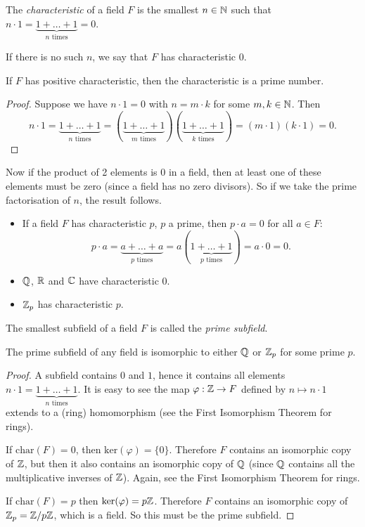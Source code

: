 \begin{definition}
	The \emph{characteristic} of a field $F$ is the  smallest $n \in \mathbb{N}$ such that $n \cdot 1 = \underbrace{1 + \ldots + 1}_{n \text{ times}} = 0$.
	
	If there is no such $n$, we say that $F$ has characteristic $0$.
\end{definition}

\begin{proposition}
	If $F$ has positive characteristic, then the characteristic is a prime number.
	\begin{proof}
		Suppose we have $n \cdot 1 = 0$ with $n = m \cdot k$ for some $m, k \in \mathbb{N}$. Then
		\[
			n \cdot 1 = \underbrace{1 + \ldots + 1}_{n \text{ times}} = (\underbrace{1 + \ldots + 1}_{m \text{ times}})(\underbrace{1 + \ldots + 1}_{k \text{ times}}) = (m \cdot 1)(k \cdot 1) = 0.
		\]
	\end{proof}
	Now if the product of 2 elements is $0$ in a field, then at least one of these elements must be zero (since a field has no zero divisors). So if we take the prime factorisation of $n$, the result follows.
\end{proposition}

\begin{remarks}\hfill
	\begin{itemize}
		\item If a field $F$ has characteristic $p$, $p$ a prime, then $p \cdot a = 0$ for all $a \in F$:
		\[
			p \cdot a = \underbrace{a + \ldots + a}_{p \text{ times}} = a(\underbrace{1 + \ldots + 1}_{p \text{ times}}) = a \cdot 0 = 0.
		\]
		\item $\mathbb{Q}$, $\mathbb{R}$ and $\mathbb{C}$ have characteristic $0$.
		\item $\mathbb{Z}_p$ has characteristic $p$.
	\end{itemize}
\end{remarks}

\begin{definition}
	The smallest subfield of a field $F$ is called the \emph{prime subfield}.
\end{definition}

\begin{proposition}
	The prime subfield of any field is isomorphic to either $\mathbb{Q}$ or $\mathbb{Z}_p$ for some prime $p$.
	\begin{proof}
		A subfield contains $0$ and $1$, hence it contains all elements $n \cdot 1 = \underbrace{1 + \ldots + 1}_{n \text{ times}}$. It is easy to see the map $\varphi : \mathbb{Z} \to F$ defined by $n \mapsto n \cdot 1$ extends to a (ring) homomorphism (see the First Isomorphism Theorem for rings).
		
		If $\text{char}(F) = 0$, then $\text{ker}(\varphi) = \{0\}$. Therefore $F$ contains an isomorphic copy of $\mathbb{Z}$, but then it also contains an isomorphic copy of $\mathbb{Q}$ (since $\mathbb{Q}$ contains all the multiplicative inverses of $\mathbb{Z}$). Again, see the First Isomorphism Theorem for rings.
		
		If $\text{char}(F) = p$ then $\text{ker}(\varphi) = p\mathbb{Z}$. Therefore $F$ contains an isomorphic copy of $\mathbb{Z}_p = \mathbb{Z} / p\mathbb{Z}$, which is  a field. So this must be the prime subfield.
	\end{proof}
\end{proposition}

